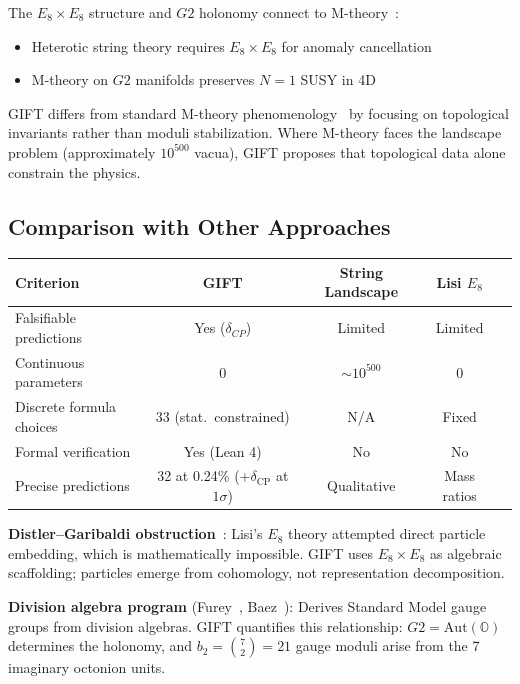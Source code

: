 \documentclass[11pt,a4paper]{article}
\newcommand{\E}{\mathrm{E}}
\newcommand{\Gtwo}{\mathrm{G}_2}
\newcommand{\CP}{\mathrm{CP}}
\def\CP{CP}%
\def\Gtwo{G2}%
\def\E{E}%
\begin{document}
The $\E_8 \times \E_8$ structure and $\Gtwo$ holonomy connect to M-theory~\cite{witten1996,acharya2007,atiyah2002}:

\begin{itemize}
\item Heterotic string theory requires $\E_8 \times \E_8$ for anomaly cancellation~\cite{gross1985}
\item M-theory on $\Gtwo$ manifolds preserves $N=1$ SUSY in 4D~\cite{kane2017}
\end{itemize}

GIFT differs from standard M-theory phenomenology~\cite{distler2010} by focusing on topological invariants rather than moduli stabilization. Where M-theory faces the landscape problem (approximately $10^{500}$ vacua), GIFT proposes that topological data alone constrain the physics.

\subsection{Comparison with Other Approaches}

\begin{table}[H]
\centering
\small
\begin{tabular}{lcccc}
\toprule
Criterion & GIFT & String Landscape & Lisi $\E_8$ \\
\midrule
Falsifiable predictions & Yes ($\delta_{\CP}$) & Limited & Limited \\
Continuous parameters & 0 & $\sim 10^{500}$ & 0 \\
Discrete formula choices & 33 (stat.\ constrained) & N/A & Fixed \\
Formal verification & Yes (Lean 4) & No & No \\
Precise predictions & 32 at 0.24\% (+$\delta_{\mathrm{CP}}$ at $1\sigma$) & Qualitative & Mass ratios \\
\bottomrule
\end{tabular}
\end{table}

\textbf{Distler--Garibaldi obstruction}~\cite{distler2010}: Lisi's $\E_8$ theory attempted direct particle embedding, which is mathematically impossible. GIFT uses $\E_8 \times \E_8$ as algebraic scaffolding; particles emerge from cohomology, not representation decomposition.

\textbf{Division algebra program} (Furey~\cite{furey2015}, Baez~\cite{baez2020}): Derives Standard Model gauge groups from division algebras. GIFT quantifies this relationship: $\Gtwo = \mathrm{Aut}(\mathbb{O})$ determines the holonomy, and $b_2 = \binom{7}{2} = 21$ gauge moduli arise from the 7 imaginary octonion units.
\end{document}
